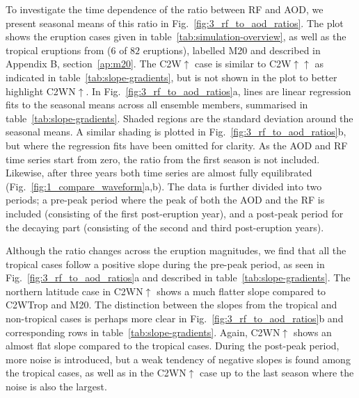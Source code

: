 \documentclass[draft]{agujournal2019}
\begin{document}
  To investigate the time dependence of the ratio between RF and AOD, we present
  seasonal means of this ratio in Fig.~\ref{fig:3_rf_to_aod_ratios}. The plot shows the
  eruption cases given in table~\ref{tab:simulation-overview}, as well as the tropical
  eruptions from  (\(6\) of \(82\) eruptions), labelled M20
  and described in Appendix B, section~\ref{ap:m20}. The C2W\(\uparrow\) case is similar
  to C2W\(\uparrow\uparrow\) as indicated in table~\ref{tab:slope-gradients}, but is not
  shown in the plot to better highlight C2WN\(\uparrow\). In
  Fig.~\ref{fig:3_rf_to_aod_ratios}a, lines are linear regression fits to the seasonal
  means across all ensemble members, summarised in table~\ref{tab:slope-gradients}.
  Shaded regions are the standard deviation around the seasonal means. A similar shading
  is plotted in Fig.~\ref{fig:3_rf_to_aod_ratios}b, but where the regression fits have
  been omitted for clarity. As the AOD and RF time series start from zero, the ratio
  from the first season is not included. Likewise, after three years both time series
  are almost fully equilibrated (Fig.~\ref{fig:1_compare_waveform}a,b). The data is
  further divided into two periods; a pre-peak period where the peak of both the AOD and
  the RF is included (consisting of the first post-eruption year), and a post-peak
  period for the decaying part (consisting of the second and third post-eruption years).

  Although the ratio changes across the eruption magnitudes, we find that all the
  tropical cases follow a positive slope during the pre-peak period, as seen in
  Fig.~\ref{fig:3_rf_to_aod_ratios}a and described in table~\ref{tab:slope-gradients}.
  The northern latitude case in C2WN\(\uparrow\) shows a much flatter slope compared to
  C2WTrop and M20. The distinction between the slopes from the tropical and non-tropical
  cases is perhaps more clear in Fig.~\ref{fig:3_rf_to_aod_ratios}b and corresponding
  rows in table~\ref{tab:slope-gradients}. Again, C2WN\(\uparrow\) shows an almost flat
  slope compared to the tropical cases. During the post-peak period, more noise is
  introduced, but a weak tendency of negative slopes is found among the tropical cases,
  as well as in the C2WN\(\uparrow\) case up to the last season where the noise is also
  the largest.
\end{document}
